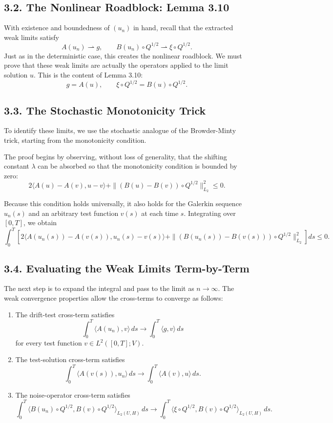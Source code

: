 \documentclass[11pt]{article}
\theoremstyle{definition}
\theoremstyle{remark}
\begin{document}
\subsection*{3.2. The Nonlinear Roadblock: Lemma 3.10}
With existence and boundedness of \((u_n)\) in hand, recall that the extracted weak limits satisfy
\[
A(u_n)\rightharpoonup g,
\qquad
B(u_n)\circ Q^{1/2}\rightharpoonup \xi\circ Q^{1/2}.
\]
Just as in the deterministic case, this creates the nonlinear roadblock. We must prove that these weak limits are actually the operators applied to the limit solution \(u\). This is the content of Lemma 3.10:
\[
g=A(u),
\qquad
\xi\circ Q^{1/2}=B(u)\circ Q^{1/2}.
\]

\subsection*{3.3. The Stochastic Monotonicity Trick}
To identify these limits, we use the stochastic analogue of the Browder-Minty trick, starting from the monotonicity condition.

The proof begins by observing, without loss of generality, that the shifting constant \(\lambda\) can be absorbed so that the monotonicity condition is bounded by zero:
\[
2\langle A(u)-A(v),u-v\rangle
+
\|(B(u)-B(v))\circ Q^{1/2}\|_{L_2}^2
\le 0.
\]

Because this condition holds universally, it also holds for the Galerkin sequence \(u_n(s)\) and an arbitrary test function \(v(s)\) at each time \(s\). Integrating over \([0,T]\), we obtain
\[
\int_0^T
\left[
2\langle A(u_n(s))-A(v(s)),u_n(s)-v(s)\rangle
+
\|(B(u_n(s))-B(v(s)))\circ Q^{1/2}\|_{L_2}^2
\right]ds
\le 0.
\]

\subsection*{3.4. Evaluating the Weak Limits Term-by-Term}
The next step is to expand the integral and pass to the limit as \(n\to\infty\). The weak convergence properties allow the cross-terms to converge as follows:
\begin{enumerate}
\item The drift-test cross-term satisfies
\[
\int_0^T \langle A(u_n),v\rangle\,ds
\to
\int_0^T \langle g,v\rangle\,ds
\]
for every test function \(v\in L^2([0,T];V)\).

\item The test-solution cross-term satisfies
\[
\int_0^T \langle A(v(s)),u_n\rangle\,ds
\to
\int_0^T \langle A(v),u\rangle\,ds.
\]

\item The noise-operator cross-term satisfies
\[
\int_0^T \langle B(u_n)\circ Q^{1/2},B(v)\circ Q^{1/2}\rangle_{L_2(U,H)}\,ds
\to
\int_0^T \langle \xi\circ Q^{1/2},B(v)\circ Q^{1/2}\rangle_{L_2(U,H)}\,ds.
\]
\end{enumerate}
\end{document}
